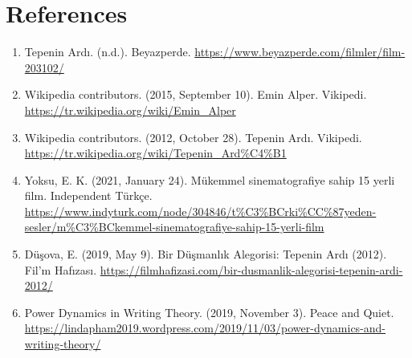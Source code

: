 \documentclass[12pt]{article}
\begin{document}
\section*{References}

\begin{enumerate}
        \item Tepenin Ardı. (n.d.). Beyazperde. \url{https://www.beyazperde.com/filmler/film-203102/}
        \item Wikipedia contributors. (2015, September 10). Emin Alper. Vikipedi. \url{https://tr.wikipedia.org/wiki/Emin_Alper}
        \item Wikipedia contributors. (2012, October 28). Tepenin Ardı. Vikipedi. \url{https://tr.wikipedia.org/wiki/Tepenin_Ard%C4%B1}
        \item Yoksu, E. K. (2021, January 24). Mükemmel sinematografiye sahip 15 yerli film. Independent Türkçe. \url{https://www.indyturk.com/node/304846/t%C3%BCrki%CC%87yeden-sesler/m%C3%BCkemmel-sinematografiye-sahip-15-yerli-film}
        \item Düşova, E. (2019, May 9). Bir Düşmanlık Alegorisi: Tepenin Ardı (2012). Fil’m Hafızası. \url{https://filmhafizasi.com/bir-dusmanlik-alegorisi-tepenin-ardi-2012/}
        \item Power Dynamics in Writing Theory. (2019, November 3). Peace and Quiet. \url{https://lindapham2019.wordpress.com/2019/11/03/power-dynamics-and-writing-theory/}
\end{enumerate}
\end{document}
